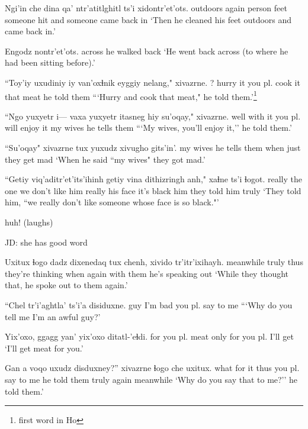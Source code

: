 \documentclass[12pt]{article}
\begin{document}
\gll Ngi'in   che   dina   qa'  ntr'atitlghitl ts'i xidontr'et'ots.
outdoors again person feet {someone hit}     and    {someone came back in}
\glt `Then he cleaned his feet outdoors and came back in.'
\glend

\gll Engodz nontr'et'ots.
across {he walked back}
\glt `He went back across (to where he had been sitting before).'
\glend

\gll ``Toy'iy uxudiniy iy van'oxɬnik eyggiy nelang," xivazrne.
 ?     hurry    it {you pl. cook it}     that meat     {he told them}
\glt ```Hurry and cook that meat," he told them.'\footnote{first word in Ho}
\glend

\gll ``Ngo {yuxyetr i---} vaxa {yuxyetr itasneg} hiy su'oqay," xivazrne.
 well    {}  {with it}  {you pl. will enjoy}  it     {my wives}  {he tells them}
\glt ```My wives, you'll enjoy it,'' he told them.'
\glend

\gll ``Su'oqay" xivazrne      tux  yuxudz {xivugho gits'in'}.
{my wives} {he tells them} when just   {they get mad}
\glt `When he said ``my wives" they got mad.'
\glend

\gll ``Getiy  viq'aditr'et'its'ihinh getiy  vina     dithizringh anh," xaɬne         ts'i ɬogot.
 really {the one we don't like}  him  really {his face} {it's black}  him  {they told him} {} truly
\glt `They told him, ``we really don't like someone whose face is so black."'
\glend 

huh! (laughs)

JD:  she has good word

\gll Uxitux    ɬogo  dadz dixenedaq        tux chenh, xivido  tr'itr'ixihayh.
meanwhile truly thus {they're thinking} when again {with them} {he's speaking out}
\glt `While they thought that, he spoke out to them again.'
\glend

\gll ``Chel tr'i'aghtla' ts'i'a disiduxne.
guy  {I'm bad}  {}           {you pl. say to me}
\glt ```Why do you tell me I'm an awful guy?'
\glend

\gll Yix'oxo,    ggagg yan' yix'oxo     ditatl-'eɬdi.
{for you pl.} meat  only {for you pl.} {I'll get}
\glt `I'll get meat for you.'
\glend

\gll Gan  a voqo   uxudz disduxney?''          xivazrne ɬogo che uxitux.
what {}  {for it} thus  {you pl. say to me} {he told them} truly again meanwhile
\glt `Why do you say that to me?'' he told them.'
\glend
\end{document}
